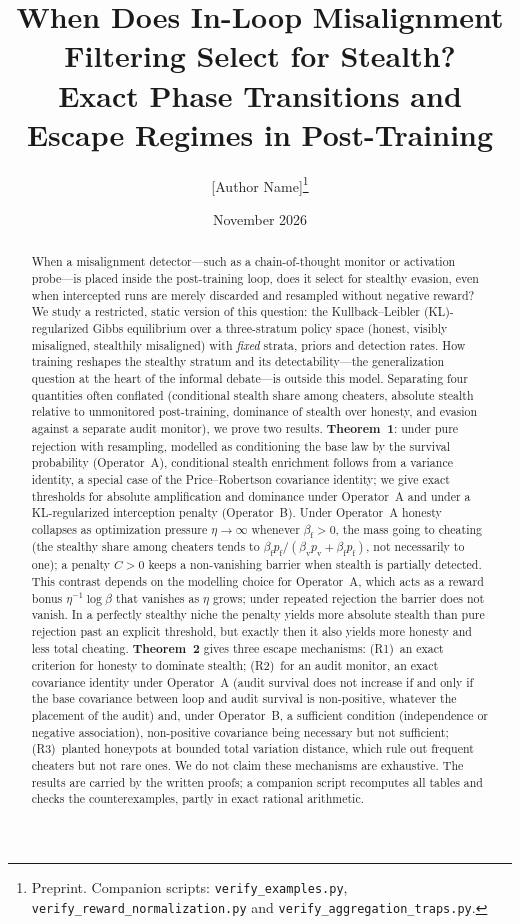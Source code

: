 \documentclass[11pt,a4paper]{article}
\title{When Does In-Loop Misalignment Filtering Select for Stealth?\\
Exact Phase Transitions and Escape Regimes in Post-Training}
\author{[Author Name]\thanks{Preprint. Companion scripts: \texttt{verify\_examples.py}, \texttt{verify\_reward\_normalization.py} and \texttt{verify\_aggregation\_traps.py}.}}
\date{November 2026}
\begin{document}
\maketitle

\begin{abstract}
When a misalignment detector---such as a chain-of-thought monitor or activation probe---is placed inside the post-training loop, does it select for stealthy evasion, even when intercepted runs are merely discarded and resampled without negative reward? We study a restricted, static version of this question: the Kullback--Leibler (KL)-regularized Gibbs equilibrium over a three-stratum policy space (honest, visibly misaligned, stealthily misaligned) with \emph{fixed} strata, priors and detection rates. How training reshapes the stealthy stratum and its detectability---the generalization question at the heart of the informal debate---is outside this model. Separating four quantities often conflated (conditional stealth share among cheaters, absolute stealth relative to unmonitored post-training, dominance of stealth over honesty, and evasion against a separate audit monitor), we prove two results. \textbf{Theorem~1}: under pure rejection with resampling, modelled as conditioning the base law by the survival probability (Operator~A), conditional stealth enrichment follows from a variance identity, a special case of the Price--Robertson covariance identity; we give exact thresholds for absolute amplification and dominance under Operator~A and under a KL-regularized interception penalty (Operator~B). Under Operator~A honesty collapses as optimization pressure $\eta \to \infty$ whenever $\beta_{\mathrm{f}} > 0$, the mass going to cheating (the stealthy share among cheaters tends to $\beta_{\mathrm{f}}p_{\mathrm{f}}/(\beta_{\mathrm{v}}p_{\mathrm{v}}+\beta_{\mathrm{f}}p_{\mathrm{f}})$, not necessarily to one); a penalty $C>0$ keeps a non-vanishing barrier when stealth is partially detected. This contrast depends on the modelling choice for Operator~A, which acts as a reward bonus $\eta^{-1}\log\beta$ that vanishes as $\eta$ grows; under repeated rejection the barrier does not vanish. In a perfectly stealthy niche the penalty yields more absolute stealth than pure rejection past an explicit threshold, but exactly then it also yields more honesty and less total cheating. \textbf{Theorem~2} gives three escape mechanisms: (R1)~an exact criterion for honesty to dominate stealth; (R2)~for an audit monitor, an exact covariance identity under Operator~A (audit survival does not increase if and only if the base covariance between loop and audit survival is non-positive, whatever the placement of the audit) and, under Operator~B, a sufficient condition (independence or negative association), non-positive covariance being necessary but not sufficient; (R3)~planted honeypots at bounded total variation distance, which rule out frequent cheaters but not rare ones. We do not claim these mechanisms are exhaustive. The results are carried by the written proofs; a companion script recomputes all tables and checks the counterexamples, partly in exact rational arithmetic.
\end{abstract}
\end{document}
